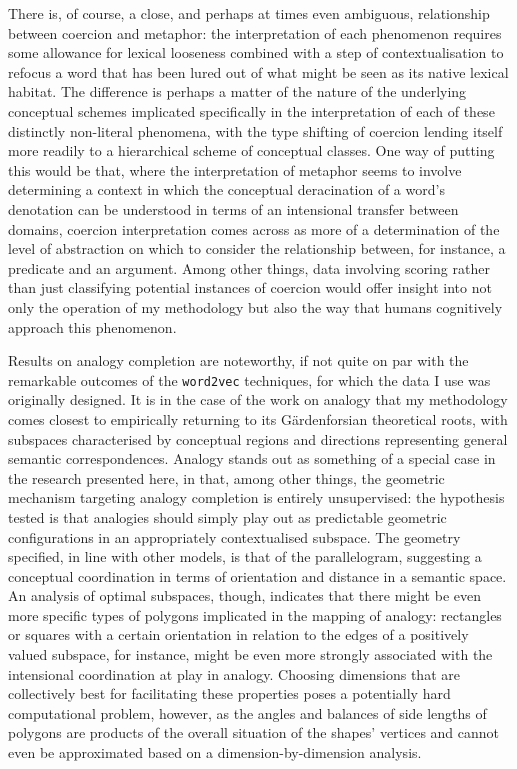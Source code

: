 There is, of course, a close, and perhaps at times even ambiguous, relationship between coercion and metaphor: the interpretation of each phenomenon requires some allowance for lexical looseness combined with a step of contextualisation to refocus a word that has been lured out of what might be seen as its native lexical habitat.  The difference is perhaps a matter of the nature of the underlying conceptual schemes implicated specifically in the interpretation of each of these distinctly non-literal phenomena, with the type shifting of coercion lending itself more readily to a hierarchical scheme of conceptual classes.  One way of putting this would be that, where the interpretation of metaphor seems to involve determining a context in which the conceptual deracination of a word's denotation can be understood in terms of an intensional transfer between domains, coercion interpretation comes across as more of a determination of the level of abstraction on which to consider the relationship between, for instance, a predicate and an argument.  Among other things, data involving scoring rather than just classifying potential instances of coercion would offer insight into not only the operation of my methodology but also the way that humans cognitively approach this phenomenon.

Results on analogy completion are noteworthy, if not quite on par with the remarkable outcomes of the \texttt{word2vec} techniques, for which the data I use was originally designed.  It is in the case of the work on analogy that my methodology comes closest to empirically returning to its G\"{a}rdenforsian theoretical roots, with subspaces characterised by conceptual regions and directions representing general semantic correspondences.  Analogy stands out as something of a special case in the research presented here, in that, among other things, the geometric mechanism targeting analogy completion is entirely unsupervised: the hypothesis tested is that analogies should simply play out as predictable geometric configurations in an appropriately contextualised subspace.  The geometry specified, in line with other models, is that of the parallelogram, suggesting a conceptual coordination in terms of orientation and distance in a semantic space.  An analysis of optimal subspaces, though, indicates that there might be even more specific types of polygons implicated in the mapping of analogy: rectangles or squares with a certain orientation in relation to the edges of a positively valued subspace, for instance, might be even more strongly associated with the intensional coordination at play in analogy.  Choosing dimensions that are collectively best for facilitating these properties poses a potentially hard computational problem, however, as the angles and balances of side lengths of polygons are products of the overall situation of the shapes' vertices and cannot even be approximated based on a dimension-by-dimension analysis.

